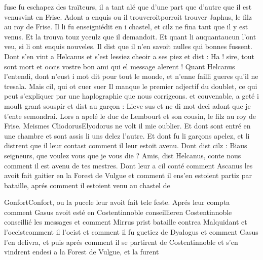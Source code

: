 \documentclass{article}
\begin{document}
\begin{pages}
                  fuse fu eschapez des traïteurs, il a tant alé que d’une part que d’autre que il 
                  est venusvint en Frise. Adont a enquis ou il 
                  trouveroitporroit trouver
               Japhus, le filz au roy de Frise. Il li fu 
                  enseigniédit en i chastel, et cilz
                  ne fina tant que il y est venus. Et la trouva touz yceulz que il demandoit. Et quant li 
                  auquantaucun l’ont veu, si li ont enquis nouveles. Il dist 
                  que il n’en savoit nulles qui bonnes fussent. Dont s’en vint a Helcanus et s’est lessiez cheoir a ses piez et dist :
                  Ha ! sire, tout sont mort et occis vostre bon ami
                  qui el message alerent ! Quant Helcanus
               l’entendi, dont n’eust 
                  i mot dit pour tout le monde, et 
                  n’enne failli gueres qu’il ne tresala. Mais cil, qui ot cuer suer Il manque le premier adjectif du doublet, ce qui peut
                  s'expliquer par une haplographie que nous corrigeons. et couvenable, a geté
                  i moult grant souspir et dist au garçon : Lieve sus
                  et ne di mot deci adont que je 
                     t’ente semondrai. Lors a apelé le duc de
                     Lembourt et son cousin, le filz au roy de
                     Frise. Meismes 
                  CliodorusElyodorus ne volt il mie oublier. Et 
                  dont sont entré en une chambre et sont assis li uns delez l’autre. Et dont fu li garçons apelez, et li distrent que
                  il leur contast comment il leur estoit
                  avenu. Dont dist cilz : Biaus seigneurs,
                  que voulez vous que je vous die ?
               Amis, dist Helcanus, conte nous comment il est avenu de tes mestres.
               Dont leur a cil conté comment Ascanus les avoit fait gaitier en la Forest de Vulgue et comment il 
                     ens'en estoient partiz par bataille, aprés comment il estoient venu au chastel de
                     
                        GonfortConfort, ou la pucele leur avoit
                  fait tele feste. Aprés leur compta comment Gasus avoit 
                     esté en Costentinnoble conseillieren Costentinnoble conseillié les messages et comment Mirrus prist
                  bataille 
                     contrea
                  Malquidant et 
                     l’occistcomment il l'ocist et comment il fu guetiez de Dyalogus et 
                     comment
                  Gasus l’en delivra, et puis aprés comment il 
                     se partirent de Costentinnoble et
                  s’en vindrent 
                     endesi a la Forest de Vulgue, et la
                  furent 
                     

\end{pages}
\end{document}
